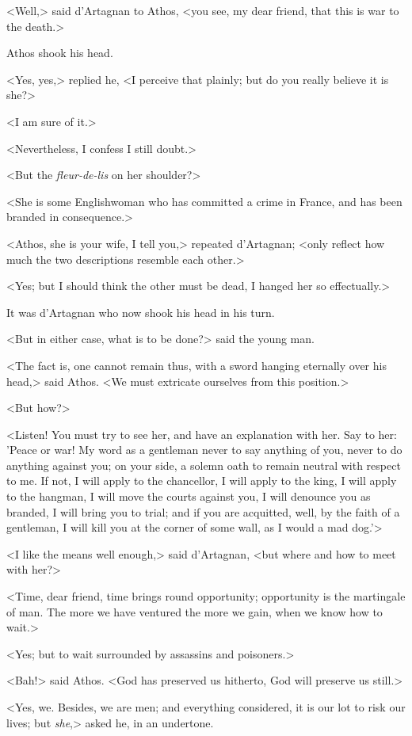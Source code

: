 <Well,> said d'Artagnan to Athos, <you see, my dear friend, that this is war to the death.> 

Athos shook his head. 

<Yes, yes,> replied he, <I perceive that plainly; but do you really believe it is she?> 

<I am sure of it.> 

<Nevertheless, I confess I still doubt.> 

<But the \textit{fleur-de-lis} on her shoulder?> 

<She is some Englishwoman who has committed a crime in France, and has been branded in consequence.> 

<Athos, she is your wife, I tell you,> repeated d'Artagnan; <only reflect how much the two descriptions resemble each other.> 

<Yes; but I should think the other must be dead, I hanged her so effectually.> 

It was d'Artagnan who now shook his head in his turn. 

<But in either case, what is to be done?> said the young man. 

<The fact is, one cannot remain thus, with a sword hanging eternally over his head,> said Athos. <We must extricate ourselves from this position.> 

<But how?> 

<Listen! You must try to see her, and have an explanation with her. Say to her: 'Peace or war! My word as a gentleman never to say anything of you, never to do anything against you; on your side, a solemn oath to remain neutral with respect to me. If not, I will apply to the chancellor, I will apply to the king, I will apply to the hangman, I will move the courts against you, I will denounce you as branded, I will bring you to trial; and if you are acquitted, well, by the faith of a gentleman, I will kill you at the corner of some wall, as I would a mad dog.'> 

<I like the means well enough,> said d'Artagnan, <but where and how to meet with her?> 

<Time, dear friend, time brings round opportunity; opportunity is the martingale of man. The more we have ventured the more we gain, when we know how to wait.> 

<Yes; but to wait surrounded by assassins and poisoners.> 

<Bah!> said Athos. <God has preserved us hitherto, God will preserve us still.> 

<Yes, we. Besides, we are men; and everything considered, it is our lot to risk our lives; but \textit{she},> asked he, in an undertone. 

